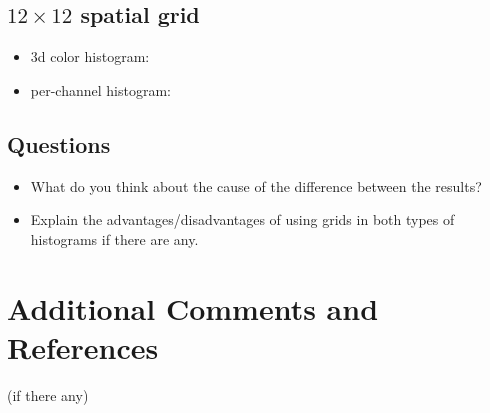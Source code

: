 \documentclass[12pt]{article}
\begin{document}
\subsection{$12\times12$ spatial grid}
\begin{itemize}
\item 3d color histogram:
\item per-channel histogram:
\end{itemize}

\subsection{Questions}
\begin{itemize}
\item What do you think about the cause of the difference between the results?
\item Explain the advantages/disadvantages of using grids in both types of histograms if there are any.
\end{itemize}


\section{Additional Comments and References}

(if there any)
\end{document}
